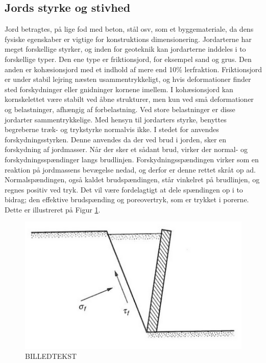 \subsection{Jords styrke og stivhed}
Jord betragtes, på lige fod med beton, stål osv, som et byggemateriale, da dens fysiske egenskaber er vigtige for konstruktions dimensionering.\citep{DGF} 
\newline \indent{     }  Jordarterne har meget forskellige styrker, og inden for geoteknik kan jordarterne inddeles i to forskellige typer. Den ene type er friktionsjord, for eksempel sand og grus. Den anden er kohæsionsjord med et indhold af mere end 10\% lerfraktion. 
Friktionsjord er under stabil lejring næsten usammentrykkeligt, og hvis deformationer finder sted forskydninger eller gnidninger kornene imellem.\citep{DGF}
\newline \indent{     }  I kohæsionsjord kan kornskelettet være stabilt ved åbne strukturer, men kun ved små deformationer og belastninger, afhængig af forbelastning. Ved store belastninger er disse jordarter sammentrykkelige.
\newline \indent{     }  Med hensyn til jordarters styrke, benyttes begreberne træk- og trykstyrke normalvis ikke. I stedet for anvendes forskydningsstyrken. Denne anvendes da der ved brud i jorden, sker en forskydning af jordmasser. Når der sker et sådant brud, virker der normal- og forskydningsspændinger langs brudlinjen.\citep{geoteknik} Forskydningsspændingen virker som en reaktion på jordmassens bevægelse nedad, og derfor er denne rettet skråt op ad. Normalspændingen, også kaldet brudspændingen, står vinkelret på brudlinjen, og regnes positiv ved tryk. Det vil være fordelagtigt at dele spændingen op i to bidrag; den effektive brudspænding og poreovertryk, som er trykket i porerne\citep{geoteknik}. Dette er illustreret på Figur \ref{fig:poretrykket}. 

\begin{figure}[htbp] \centering
	\begin{minipage}[b]{0.48\textwidth}\centering
		\includegraphics[width=1.0\textwidth]{billeder/poretrykket.png}
		\caption{BILLEDTEKST}
		\label{fig:poretrykket}
	\end{minipage}\hfill
\end{figure}

